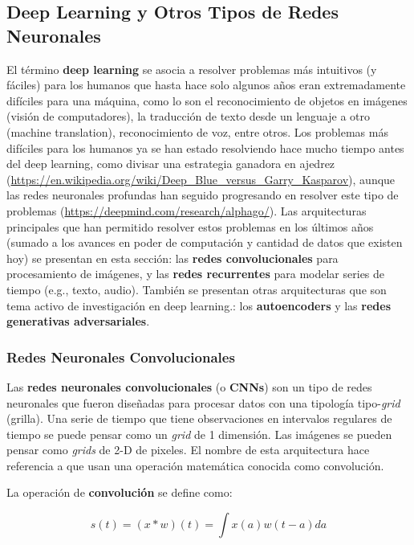 \subsection{Deep Learning y Otros Tipos de Redes Neuronales}

El t\'ermino \textbf{deep learning} se asocia a resolver problemas m\'as intuitivos (y f\'aciles) para los humanos que hasta hace solo algunos a{\~{n}}os eran extremadamente dif\'iciles para una m\'aquina, como lo son el reconocimiento de objetos en im\'agenes (visi\'on de computadores), la traducci\'on de texto desde un lenguaje a otro (machine translation), reconocimiento de voz, entre otros. Los problemas m\'as dif\'iciles para los humanos ya se han estado resolviendo hace mucho tiempo antes del deep learning, como divisar una estrategia ganadora en ajedrez (\url{https://en.wikipedia.org/wiki/Deep_Blue_versus_Garry_Kasparov}), aunque las redes neuronales profundas han seguido progresando en resolver este tipo de problemas (\url{https://deepmind.com/research/alphago/}). Las arquitecturas principales que han permitido resolver estos problemas en los \'ultimos a{\~{n}}os (sumado a los avances en poder de computaci\'on y cantidad de datos que existen hoy) se presentan en esta secci\'on: las \textbf{redes convolucionales} para procesamiento de im\'agenes, y las \textbf{redes recurrentes} para modelar series de tiempo (e.g., texto, audio). Tambi\'en se presentan otras arquitecturas que son tema activo de investigaci\'on en deep learning.: los \textbf{autoencoders} y las \textbf{redes generativas adversariales}.

\subsubsection{Redes Neuronales Convolucionales}

Las \textbf{redes neuronales convolucionales} (o \textbf{CNNs}) son un tipo de redes neuronales que fueron dise{\~{n}}adas para procesar datos con una tipolog\'ia tipo-\textit{grid} (grilla). Una serie de tiempo que tiene observaciones en intervalos regulares de tiempo se puede pensar como un \textit{grid} de 1 dimensi\'on. Las im\'agenes se pueden pensar como \textit{grids} de 2-D de pixeles. El nombre de esta arquitectura hace referencia a que usan una operaci\'on matem\'atica conocida como convoluci\'on.

La operaci\'on de \textbf{convoluci\'on} se define como:

\begin{equation}
s(t) = (x * w)(t) = \int x(a)w(t-a)da
\end{equation}

